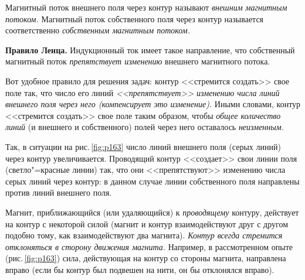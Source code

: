 \documentclass[main.tex]{subfiles}
\begin{document}
Магнитный поток внешнего поля через контур называют \emph{внешним магнитным потоком.} Магнитный поток собственного поля через контур называется соответственно \emph{собственным магнитным потоком.} %
\begin{law}
    \textbf{Правило Ленца.} Индукционный ток имеет такое направление, что собственный магнитный поток \emph{препятствует изменению} внешнего магнитного потока.
\end{law}

Вот удобное правило для решения задач: контур <<стремится создать>> свое поле так, что число его линий \emph{<<препятствует>> изменению числа линий внешнего поля через него (компенсирует это изменение).} Иными словами, контур <<стремится создать>> свое поле таким образом, чтобы \emph{общее количество линий} (и внешнего и собственного) полей через него оставалось \emph{неизменным.}

Так, в ситуации на рис.\,\ref{fig:p163} число линий внешнего поля (серых линий) через контур увеличивается. Проводящий контур <<создает>> свои линии поля (светло"=красные линии) так, что они <<препятствуют>> изменению числа серых линий через контур: в данном случае линии собственного поля направлены против линий внешнего поля.

Магнит, приближающийся (или удаляющийся) к \emph{проводящему} контуру, действует на контур с некоторой силой 
(магнит и контур взаимодействуют друг с другом подобно тому, как взаимодействуют два магнита). 
\emph{Контур всегда стремится отклоняться в сторону движения магнита.} Например, в рассмотренном опыте (рис.\,\ref{fig:p163}) сила, действующая на контур со стороны магнита, направлена вправо (если бы контур был подвешен на нити, он бы отклонялся вправо).  














 
\end{document}
